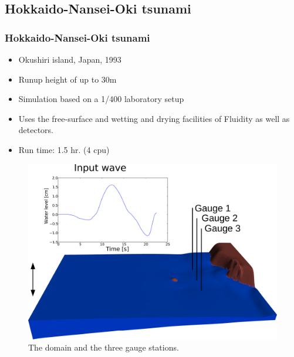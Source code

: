 \subsection{Hokkaido-Nansei-Oki tsunami}

\begin{frame}
    \frametitle{Hokkaido-Nansei-Oki tsunami}
\begin{minipage}[]{0.5\linewidth} 
\begin{itemize}
\item Okushiri island, Japan, 1993 
\item Runup height of up to 30m
\item Simulation based on a 1/400 laboratory setup 
\item Uses the free-surface and wetting and drying facilities of Fluidity as well as detectors.
\item Run time: 1.5 hr. (4 cpu)
\end{itemize}
\end{minipage}
\hspace{0.5cm}
\begin{minipage}[]{0.4\linewidth} 
\begin{figure}
\begin{center}
\includegraphics[width=\textwidth]{hokkaido-nansei-oki_tsunami/MonaiValleyDomainWithInputWave2_png.pdf}
\end{center}
\caption{The domain and the three gauge stations.}\label{fig:monai_inputwave}
\end{figure}
\end{minipage}
\end{frame}

